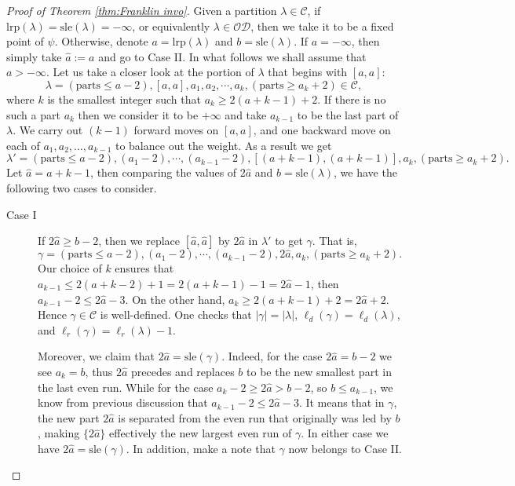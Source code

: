 \documentclass[11pt,reqno]{amsart}
\numberwithin{equation}{section}
\theoremstyle{plain}
\theoremstyle{definition}
\newcommand{\abs}[1]{\left|#1\right|}
\def\la{\lambda}
\def\C{\mathcal{C}}
\def\O{\mathcal{O}}
\def\gam{\gamma}
\newcommand{\D}{\mathcal{D}}
\def\lrp{\mathrm{lrp}}
\def\sle{\mathrm{sle}}
\begin{document}
\begin{proof}[Proof of Theorem \ref{thm:Franklin invo}]
Given a partition $\la\in\C$, if $\lrp(\la)=\sle(\la)=-\infty$, or equivalently $\la\in\O\D$, then we take it to be a fixed point of $\psi$. Otherwise, denote $a=\lrp(\la)$ and $b=\sle(\la)$. If $a=-\infty$, then simply take $\hat{a}:=a$ and go to Case II. In what follows we shall assume that $a>-\infty$. Let us take a closer look at the portion of $\la$ that begins with $[a,a]$:
$$
\la=(\text{parts}\leq a-2), [a, a], a_{1}, a_{2}, \cdots, a_{k}, (\text{parts}\geq a_{k}+2)\in\C,
$$  
where $k$ is the smallest integer such that $a_{k}\geq 2(a+k-1)+2$. If there is no such a part $a_{k}$ then we consider it to be $+\infty$ and take $a_{k-1}$ to be the last part of $\la$. We carry out $(k-1)$ forward moves on $[a, a]$, and one backward move on each of $a_1,a_2,\ldots,a_{k-1}$ to balance out the weight. As a result we get 
$$
\la'=(\text{parts}\leq a-2), (a_{1}-2), \cdots, (a_{k-1}-2), [(a+k-1), (a+k-1)], a_{k}, (\text{parts}\geq a_{k}+2).
$$
Let $\hat{a}=a+k-1$, then comparing the values of $2\hat{a}$ and $b=\sle(\la)$, we have the following two cases to consider.
\begin{description}

\item[Case I] If $2\hat{a}\geq b-2$, then we replace $[\hat{a}, \hat{a}]$ by $2\hat{a}$ in $\lambda'$ to get $\gam$. That is,
$$
\gam=(\text{parts}\leq a-2), (a_{1}-2), \cdots, (a_{k-1}-2), 2\hat{a}, a_{k}, (\text{parts}\geq a_{k}+2).
$$
Our choice of $k$ ensures that $a_{k-1}\leq 2(a+k-2)+1=2(a+k-1)-1=2\hat{a}-1$, then $a_{k-1}-2\leq 2\hat{a}-3$. On the other hand, $a_{k}\geq 2(a+k-1)+2=2\hat{a}+2$. Hence $\gam\in\C$ is well-defined. One checks that $\abs{\gam}=\abs{\la}$, $\ell_d(\gam)=\ell_d(\la)$, and $\ell_r(\gam)=\ell_r(\la)-1$. 

Moreover, we claim that $2\hat{a}=\sle(\gam)$. Indeed, for the case $2\hat{a}=b-2$ we see $a_{k}=b$, thus $2\hat{a}$ precedes and replaces $b$ to be the new smallest part in the last even run. While for the case $a_k-2\ge 2\hat{a}>b-2$, so $b\le a_{k-1}$, we know from previous discussion that $a_{k-1}-2\leq 2\hat{a}-3$. It means that in $\gam$, the new part $2\hat{a}$ is separated from the even run that originally was led by $b$, making $\{2\hat{a}\}$ effectively the new largest even run of $\gam$. In either case we have $2\hat{a}=\sle(\gam)$. In addition, make a note that $\gam$ now belongs to Case II. 


\end{description}
\end{proof}
\end{document}
